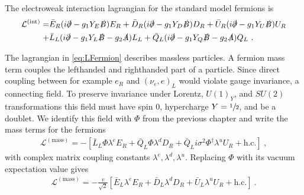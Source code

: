 The electroweak interaction lagrangian for the standard model fermions is
\begin{align}\label{eq:LFermion}
	\mathcal{L}^{(\text{int})} = &\bar{E}_R(i\slashed{\partial}-g_1Y_E\slashed{B})E_R + \bar{D}_R(i\slashed{\partial}-g_1Y_D\slashed{B})D_R + \bar{U}_R(i\slashed{\partial}-g_1Y_U\slashed{B})U_R \notag \\
	+ &\bar{L}_L(i\slashed{\partial}-g_1Y_L\slashed{B}-g_2\slashed{A})L_L + \bar{Q}_L(i\slashed{\partial}-g_1Y_Q\slashed{B}-g_2\slashed{A})Q_L \ .
\end{align}



The lagrangian in \eqref{eq:LFermion} describes massless particles. A fermion mass term couples the lefthanded and righthanded part of a particle. Since direct coupling between for example $e_R$ and $(\nu_e,e)_L$ would violate gauge invariance, a connecting field. To preserve invariance under Lorentz, $U(1)_Y$, and $SU(2)$ transformations this field must have spin 0, hypercharge $Y=\sfrac{1}{2}$, and be a doublet. We identify this field with $\Phi$ from the previous chapter and write the mass terms for the fermions
\begin{align}
	\mathcal{L}^{(\text{mass})} = -\left[\bar{L}_L\Phi\lambda^e  E_R  + \bar{Q}_L\Phi\lambda^d D_R + \bar{Q}_Li\sigma^2\Phi^\dagger\lambda^u U_R + \text{h.c.}\right] \ ,
\end{align}
with complex matrix coupling constants $\lambda^e,\lambda^d,\lambda^u$. Replacing $\Phi$ with its vacuum expectation value gives
\begin{align}\label{eq:LMass}
	\mathcal{L}^{(\text{mass})} = -\frac{v}{\sqrt{2}}\left[ \bar{E}_L\lambda^e E_R  + \bar{D}_L \lambda^dD_R + \bar{U}_L\lambda^u U_R + \text{h.c.}\right] \ .
\end{align}



